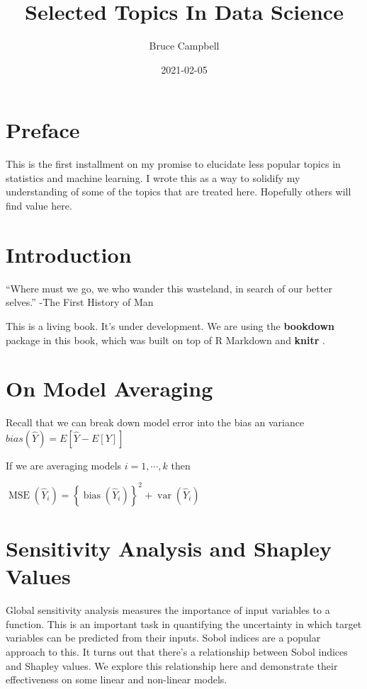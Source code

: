 \documentclass[
  11pt,
]{book}
\title{Selected Topics In Data Science}
\author{Bruce Campbell}
\date{2021-02-05}
\begin{document}
\maketitle

\hypertarget{preface}{%
\chapter{Preface}\label{preface}}

This is the first installment on my promise to elucidate less popular topics in statistics and machine learning. I wrote this as a way to solidify my understanding of some of the topics that are treated here. Hopefully others will find value here.

\hypertarget{intro}{%
\chapter{Introduction}\label{intro}}

``Where must we go, we who wander this wasteland, in search of our better selves.'' -The First History of Man

This is a living book. It's under development. We are using the \textbf{bookdown} package \citep{R-bookdown} in this book, which was built on top of R Markdown and \textbf{knitr} \citep{xie2015}.

\hypertarget{on-model-averaging}{%
\chapter{On Model Averaging}\label{on-model-averaging}}

Recall that we can break down model error into the bias an variance \(bias(\hat{Y})= E[\hat{Y}-E[Y]]\)

If we are averaging models \(i=1, \cdots ,k\) then

\(\operatorname{MSE}\left(\hat{Y}_{i}\right)=\left\{\operatorname{bias}\left(\hat{Y}_{i}\right)\right\}^{2}+\operatorname{var}\left(\hat{Y}_{i}\right)\)

\hypertarget{sensitivity-analysis-and-shapley-values}{%
\chapter{Sensitivity Analysis and Shapley Values}\label{sensitivity-analysis-and-shapley-values}}

Global sensitivity analysis measures the importance of input variables to a function. This is an important task in quantifying the uncertainty in which target variables can be predicted from their inputs. Sobol indices \citep{sobolindices} are a popular approach to this. It turns out that there's a relationship between Sobol indices and Shapley values. We explore this relationship here and demonstrate their effectiveness on some linear and non-linear models.
\end{document}
